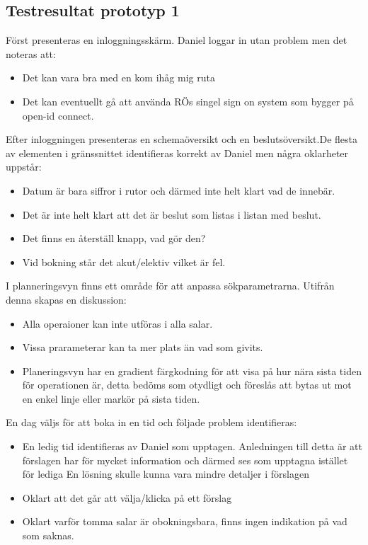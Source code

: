 \documentclass[a4paper,10pt]{article}
\begin{document}
\subsection{Testresultat prototyp 1}
Först presenteras en inloggningsskärm. Daniel loggar in utan problem men det noteras att:
\begin{itemize}
  \item Det kan vara bra med en kom ihåg mig ruta
  \item Det kan eventuellt gå att använda RÖs singel sign on system som bygger på open-id connect.
\end{itemize}
Efter inloggningen presenteras en schemaöversikt och en beslutsöversikt.De flesta av elementen i gränssnittet identifieras korrekt av Daniel men några oklarheter uppstår:
\begin{itemize}
\item Datum är bara siffror i rutor och därmed inte helt klart vad de innebär.
\item Det är inte helt klart att det är beslut som listas i listan med beslut.
\item Det finns en återställ knapp, vad gör den?
\item Vid bokning står det akut/elektiv vilket är fel.
\end{itemize}
I planneringsvyn finns ett område för att anpassa sökparametrarna. Utifrån denna skapas en diskussion:
\begin{itemize}
\item Alla operaioner kan inte utföras i alla salar.
\item Vissa prarameterar kan ta mer plats än vad som givits.
\item Planeringsvyn har en gradient färgkodning för att visa på hur nära sista tiden för operationen är, detta bedöms som otydligt och föreslås att bytas ut mot en enkel linje eller markör på sista tiden.
\end{itemize}

En dag väljs för att boka in en tid och följade problem identifieras: \\
\begin{itemize}
\item En ledig tid identifieras av Daniel som upptagen. Anledningen till detta är att förslagen har för mycket information och därmed ses som upptagna istället för lediga
En lösning skulle kunna vara mindre detaljer i förslagen
\item Oklart att det går att välja/klicka på ett förslag
\item Oklart varför tomma salar är obokningsbara, finns ingen indikation på vad som saknas.
\end{itemize}
\end{document}
